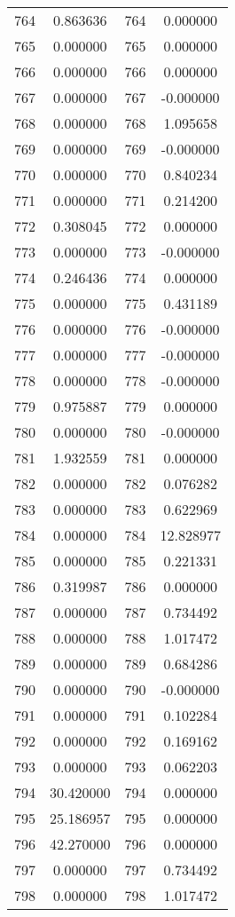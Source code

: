 \documentclass[12pt]{article}
\begin{document}
\begin{longtable}{@{}cccc@{}}
764 & 0.863636 & 764 & 0.000000 \\
765 & 0.000000 & 765 & 0.000000 \\
766 & 0.000000 & 766 & 0.000000 \\
767 & 0.000000 & 767 & -0.000000 \\
768 & 0.000000 & 768 & 1.095658 \\
769 & 0.000000 & 769 & -0.000000 \\
770 & 0.000000 & 770 & 0.840234 \\
771 & 0.000000 & 771 & 0.214200 \\
772 & 0.308045 & 772 & 0.000000 \\
773 & 0.000000 & 773 & -0.000000 \\
774 & 0.246436 & 774 & 0.000000 \\
775 & 0.000000 & 775 & 0.431189 \\
776 & 0.000000 & 776 & -0.000000 \\
777 & 0.000000 & 777 & -0.000000 \\
778 & 0.000000 & 778 & -0.000000 \\
779 & 0.975887 & 779 & 0.000000 \\
780 & 0.000000 & 780 & -0.000000 \\
781 & 1.932559 & 781 & 0.000000 \\
782 & 0.000000 & 782 & 0.076282 \\
783 & 0.000000 & 783 & 0.622969 \\
784 & 0.000000 & 784 & 12.828977 \\
785 & 0.000000 & 785 & 0.221331 \\
786 & 0.319987 & 786 & 0.000000 \\
787 & 0.000000 & 787 & 0.734492 \\
788 & 0.000000 & 788 & 1.017472 \\
789 & 0.000000 & 789 & 0.684286 \\
790 & 0.000000 & 790 & -0.000000 \\
791 & 0.000000 & 791 & 0.102284 \\
792 & 0.000000 & 792 & 0.169162 \\
793 & 0.000000 & 793 & 0.062203 \\
794 & 30.420000 & 794 & 0.000000 \\
795 & 25.186957 & 795 & 0.000000 \\
796 & 42.270000 & 796 & 0.000000 \\
797 & 0.000000 & 797 & 0.734492 \\
798 & 0.000000 & 798 & 1.017472 \\

\end{longtable}
\end{document}
